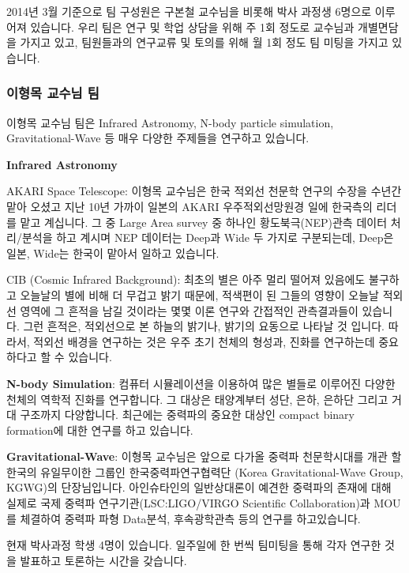 2014년 3월 기준으로 팀 구성원은 구본철 교수님을 비롯해 박사 과정생 6명으로 이루어져 있습니다. 우리 팀은 연구 및 학업 상담을 위해 주 1회 정도로 교수님과 개별면담을 가지고 있고, 팀원들과의 연구교류 및 토의를 위해 월 1회 정도 팀 미팅을 가지고 있습니다.

\subsubsection{이형목 교수님 팀}
이형목 교수님 팀은 Infrared Astronomy, N-body particle simulation, Gravitational-Wave 등 매우 다양한 주제들을 연구하고 있습니다.

\begin{packed_item}
\item \textbf{Infrared Astronomy}
\begin{packed_item}
\item AKARI Space Telescope: 이형목 교수님은 한국 적외선 천문학 연구의 수장을 수년간 맡아 오셨고 지난 10년 가까이 일본의 AKARI 우주적외선망원경 일에 한국측의 리더를 맡고 계십니다. 그 중 Large Area survey 중 하나인 황도북극(NEP)관측 데이터 처리/분석을 하고 계시며 NEP 데이터는 Deep과 Wide 두 가지로 구분되는데, Deep은 일본, Wide는 한국이 맡아서 일하고 있습니다.
\item CIB (Cosmic Infrared Background): 최초의 별은 아주 멀리 떨어져 있음에도 불구하고 오늘날의 별에 비해 더 무겁고 밝기 때문에, 적색편이 된 그들의 영향이 오늘날 적외선 영역에 그 흔적을 남길 것이라는 몇몇 이론 연구와 간접적인 관측결과들이 있습니다. 그런 흔적은, 적외선으로 본 하늘의 밝기나, 밝기의 요동으로 나타날 것 입니다. 따라서, 적외선 배경을 연구하는 것은 우주 초기 천체의 형성과, 진화를 연구하는데 중요하다고 할 수 있습니다.
\end{packed_item}

\item \textbf{N-body Simulation}: 컴퓨터 시뮬레이션을 이용하여 많은 별들로 이루어진 다양한 천체의 역학적 진화를 연구합니다. 그 대상은 태양계부터 성단, 은하, 은하단 그리고 거대 구조까지 다양합니다. 최근에는 중력파의 중요한 대상인 compact binary formation에 대한 연구를 하고 있습니다.

\item \textbf{Gravitational-Wave}: 이형목 교수님은 앞으로 다가올 중력파 천문학시대를 개관 할 한국의 유일무이한 그룹인 한국중력파연구협력단 (Korea Gravitational-Wave Group, KGWG)의 단장님입니다. 아인슈타인의 일반상대론이 예견한 중력파의 존재에 대해 실제로 국제 중력파 연구기관(LSC:LIGO/VIRGO Scientific Collaboration)과 MOU를 체결하여 중력파 파형 Data분석, 후속광학관측 등의 연구를 하고있습니다.
\end{packed_item}
현재 박사과정 학생 4명이 있습니다. 일주일에 한 번씩 팀미팅을 통해 각자 연구한 것을 발표하고 토론하는 시간을 갖습니다.

